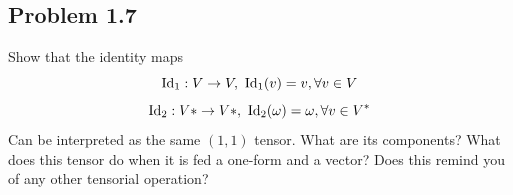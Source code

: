 	\subsection*{
		Problem 1.7
	}
	\begin{problem}
		Show that the identity maps
		\begin{equation}
			\label{eq:Id1}
		    \operatorname{Id}_1 : V\to V,\ \operatorname{Id}_1(v)= v, \forall v\in V
		\end{equation}
		\begin{equation}
			\label{eq:Id2}
			\operatorname{Id}_2 : V*\to V*,\ \operatorname{Id}_2(\omega)= \omega, \forall v\in V^*
		\end{equation}
		Can be interpreted as the same $(1,1)$ tensor. What are its components?
		What does this tensor do when it is fed a one-form and a vector? 
		Does this remind you of any other tensorial operation?
	\end{problem}
